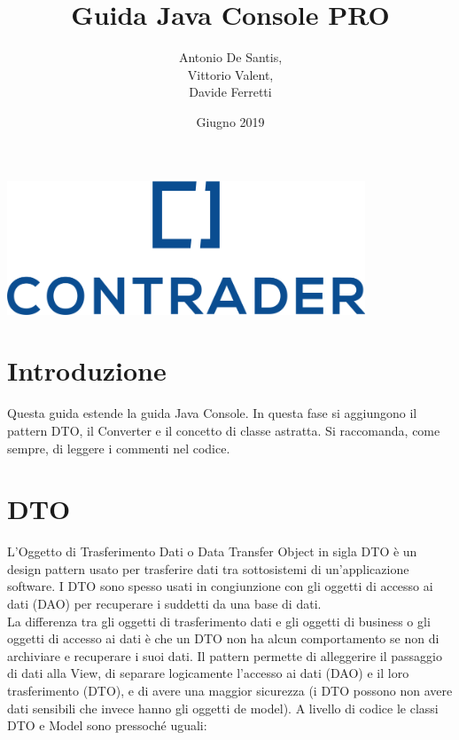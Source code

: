 \documentclass[a4paper,12 pt]{article}
\title{Guida Java Console PRO}
\author{Antonio De Santis,\\
		Vittorio Valent,\\
		Davide Ferretti}
\date{Giugno 2019}
\begin{document}
	\thispagestyle{empty}
	\begin{center}
		\includegraphics[height=4cm]{Logo.png}
	\end{center}
	
	\maketitle
	\newpage
	\tableofcontents
	\newpage

\section{Introduzione}

Questa guida estende la guida Java Console. In questa fase si aggiungono il pattern DTO, il Converter e il concetto di classe astratta. Si raccomanda, come sempre, di leggere i commenti nel codice.

\section{DTO}
L'Oggetto di Trasferimento Dati o Data Transfer Object in sigla DTO è un design pattern usato per trasferire dati tra sottosistemi di un'applicazione software. I DTO sono spesso usati in congiunzione con gli oggetti di accesso ai dati (DAO) per recuperare i suddetti da una base di dati.\\

La differenza tra gli oggetti di trasferimento dati e gli oggetti di business o gli oggetti di accesso ai dati è che un DTO non ha alcun comportamento se non di archiviare e recuperare i suoi dati. Il pattern permette di alleggerire il passaggio di dati alla View, di separare logicamente l'accesso ai dati (DAO) e il loro trasferimento (DTO), e di avere una maggior sicurezza (i DTO possono non avere dati sensibili che invece hanno gli oggetti de model). A livello di codice le classi DTO e Model sono pressoché uguali:
\end{document}
